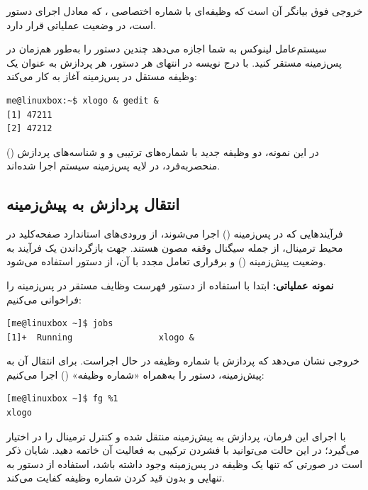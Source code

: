 خروجی فوق بیانگر آن است که وظیفه‌ای با شماره اختصاصی \cmd{[1]}، که معادل اجرای دستور  است، در وضعیت عملیاتی قرار دارد.

سیستم‌عامل لینوکس به شما اجازه می‌دهد چندین دستور را به‌طور هم‌زمان در پس‌زمینه مستقر کنید. با درج نویسه \cmd{\&} در انتهای هر دستور، هر پردازش به عنوان یک وظیفه مستقل در پس‌زمینه آغاز به کار می‌کند:

\begin{latin}
\begin{lstlisting}
me@linuxbox:~$ xlogo & gedit &
[1] 47211
[2] 47212
\end{lstlisting}
\end{latin}

در این نمونه، دو وظیفه جدید با شماره‌های ترتیبی \cmd{[1]} و \cmd{[2]} و شناسه‌های پردازش () منحصربه‌فرد، در لایه پس‌زمینه سیستم اجرا شده‌اند.

\subsection{انتقال پردازش به پیش‌زمینه}

فرآیندهایی که در پس‌زمینه () اجرا می‌شوند، از ورودی‌های استاندارد صفحه‌کلید در محیط ترمینال، از جمله سیگنال وقفه  مصون هستند. جهت بازگرداندن یک فرآیند به وضعیت پیش‌زمینه () و برقراری تعامل مجدد با آن، از دستور  استفاده می‌شود.

\textbf{نمونه عملیاتی:} ابتدا با استفاده از دستور  فهرست وظایف مستقر در پس‌زمینه را فراخوانی می‌کنیم:

\begin{latin}
\begin{lstlisting}
[me@linuxbox ~]$ jobs
[1]+  Running                 xlogo &
\end{lstlisting}
\end{latin}

خروجی نشان می‌دهد که پردازش  با شماره وظیفه \cmd{[1]} در حال اجراست. برای انتقال آن به پیش‌زمینه، دستور  را به‌همراه «شماره وظیفه» () اجرا می‌کنیم:

\begin{latin}
\begin{lstlisting}
[me@linuxbox ~]$ fg %1
xlogo
\end{lstlisting}
\end{latin}

با اجرای این فرمان، پردازش  به پیش‌زمینه منتقل شده و کنترل ترمینال را در اختیار می‌گیرد؛ در این حالت می‌توانید با فشردن ترکیبی  به فعالیت آن خاتمه دهید. شایان ذکر است در صورتی که تنها یک وظیفه در پس‌زمینه وجود داشته باشد، استفاده از دستور  به تنهایی و بدون قید کردن شماره وظیفه کفایت می‌کند.

